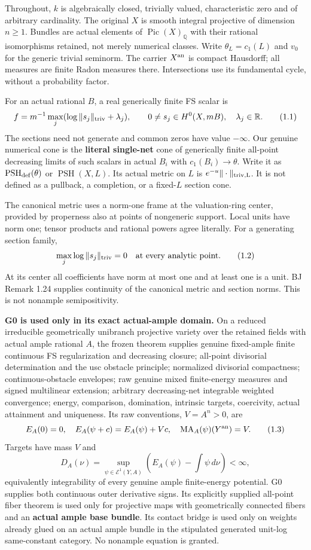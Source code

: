 \documentclass[
  10pt,
]{article}
\begin{document}
Throughout, \(k\) is algebraically closed, trivially valued,
characteristic zero and of arbitrary cardinality. The original \(X\) is
smooth integral projective of dimension \(n\geq1\). Bundles are actual
elements of \(\operatorname{Pic}(X)_{\mathbb Q}\) with their rational
isomorphisms retained, not merely numerical classes. Write
\(\theta_L=c_1(L)\) and \(v_0\) for the generic trivial seminorm. The
carrier \(X^{\rm an}\) is compact Hausdorff; all measures are finite
Radon measures there. Intersections use its fundamental cycle, without a
probability factor.

For an actual rational \(B\), a real generically finite FS scalar is
\[f=m^{-1}\max_j(\log\|s_j\|_{\rm triv}+\lambda_j),
\qquad0\ne s_j\in H^0(X,mB),\quad\lambda_j\in\mathbb R. \tag{1.1}\] The
sections need not generate and common zeros have value \(-\infty\). Our
genuine numerical cone is the \textbf{literal single-net} cone of
generically finite all-point decreasing limits of such scalars in actual
\(B_i\) with \(c_1(B_i)\to\theta\). Write it as
\(\operatorname{PSH}_{\rm def}(\theta)\) or \(\operatorname{PSH}(X,L)\).
Its actual metric on \(L\) is \(e^{-u}\|\cdot\|_{\rm triv,L}\). It is
not defined as a pullback, a completion, or a fixed-\(L\) section cone.

The canonical metric uses a norm-one frame at the valuation-ring center,
provided by properness also at points of nongeneric support. Local units
have norm one; tensor products and rational powers agree literally. For
a generating section family,
\[\max_j\log\|s_j\|_{\rm triv}=0\quad\hbox{at every analytic point}. \tag{1.2}\]
At its center all coefficients have norm at most one and at least one is
a unit. BJ Remark 1.24 supplies continuity of the canonical metric and
section norms. This is not nonample semipositivity.

\textbf{G0 is used only in its exact actual-ample domain.} On a reduced
irreducible geometrically unibranch projective variety over the retained
fields with actual ample rational \(A\), the frozen theorem supplies
genuine fixed-ample finite continuous FS regularization and decreasing
closure; all-point divisorial determination and the usc obstacle
principle; normalized divisorial compactness; continuous-obstacle
envelopes; raw genuine mixed finite-energy measures and signed
multilinear extension; arbitrary decreasing-net integrable weighted
convergence; energy, comparison, domination, intrinsic targets,
coercivity, actual attainment and uniqueness. Its raw conventions,
\(V=A^n>0\), are \[E_A(0)=0,\quad E_A(\psi+c)=E_A(\psi)+Vc,\quad
\operatorname{MA}_A(\psi)(Y^{\rm an})=V. \tag{1.3}\] Targets have mass
\(V\) and \[D_A(\nu)=\sup_{\psi\in\mathcal E^1(Y,A)}
\left(E_A(\psi)-\int\psi\,d\nu\right)<\infty, \tag{1.4}\] equivalently
integrability of every genuine ample finite-energy potential. G0
supplies both continuous outer derivative signs. Its explicitly supplied
all-point fiber theorem is used only for projective maps with
geometrically connected fibers and an \textbf{actual ample base bundle}.
Its contact bridge is used only on weights already glued on an actual
ample bundle in the stipulated generated unit-log same-constant
category. No nonample equation is granted.
\end{document}
